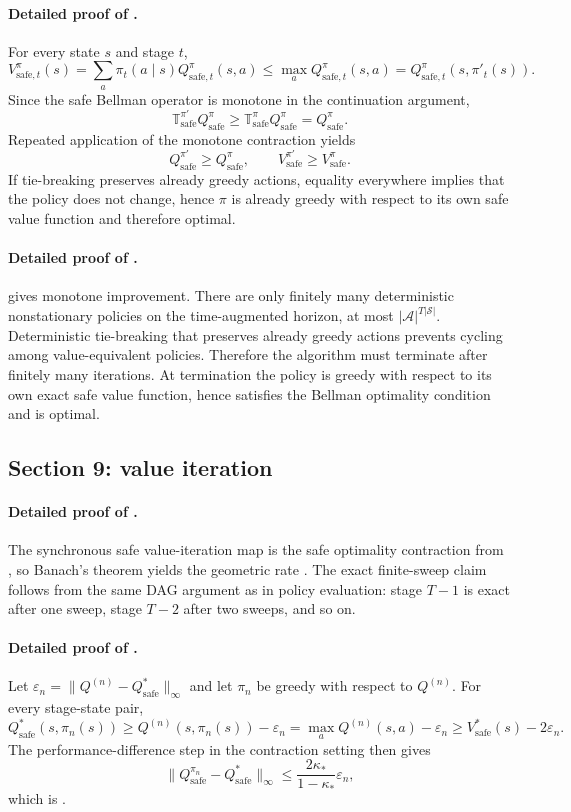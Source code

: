 \documentclass{article}
\theoremstyle{remark}
\newcommand{\cS}{\mathcal{S}}
\newcommand{\cA}{\mathcal{A}}
\newcommand{\safe}{\mathrm{safe}}
\begin{document}
\paragraph{Detailed proof of .}
For every state $s$ and stage $t$,
\[
V_{\safe,t}^{\pi}(s)=\sum_a \pi_t(a\mid s)Q_{\safe,t}^{\pi}(s,a)\le \max_a Q_{\safe,t}^{\pi}(s,a)=Q_{\safe,t}^{\pi}(s,\pi'_t(s)).
\]
Since the safe Bellman operator is monotone in the continuation argument,
\[
\mathbb T_\safe^{\pi'}Q_\safe^{\pi}\ge \mathbb T_\safe^{\pi}Q_\safe^{\pi}=Q_\safe^{\pi}.
\]
Repeated application of the monotone contraction yields
\[
Q_\safe^{\pi'}\ge Q_\safe^{\pi},
\qquad
V_\safe^{\pi'}\ge V_\safe^{\pi}.
\]
If tie-breaking preserves already greedy actions, equality everywhere implies that the policy does not change, hence $\pi$ is already greedy with respect to its own safe value function and therefore optimal.

\paragraph{Detailed proof of .}
 gives monotone improvement.
There are only finitely many deterministic nonstationary policies on the time-augmented horizon, at most $|\cA|^{T|\cS|}$.
Deterministic tie-breaking that preserves already greedy actions prevents cycling among value-equivalent policies.
Therefore the algorithm must terminate after finitely many iterations.
At termination the policy is greedy with respect to its own exact safe value function, hence satisfies the Bellman optimality condition and is optimal.

\subsection{Section 9: value iteration}
\label{app:value-iter}

\paragraph{Detailed proof of .}
The synchronous safe value-iteration map is the safe optimality contraction from , so Banach's theorem yields the geometric rate .
The exact finite-sweep claim follows from the same DAG argument as in policy evaluation: stage $T-1$ is exact after one sweep, stage $T-2$ after two sweeps, and so on.

\paragraph{Detailed proof of .}
Let $\varepsilon_n=\|Q^{(n)}-Q_\safe^*\|_\infty$ and let $\pi_n$ be greedy with respect to $Q^{(n)}$.
For every stage-state pair,
\[
Q_\safe^*(s,\pi_n(s))\ge Q^{(n)}(s,\pi_n(s)) - \varepsilon_n = \max_a Q^{(n)}(s,a)-\varepsilon_n \ge V_\safe^*(s)-2\varepsilon_n.
\]
The performance-difference step in the contraction setting then gives
\[
\|Q_\safe^{\pi_n}-Q_\safe^*\|_\infty\le \frac{2\kappa_*}{1-\kappa_*}\varepsilon_n,
\]
which is .
\end{document}
